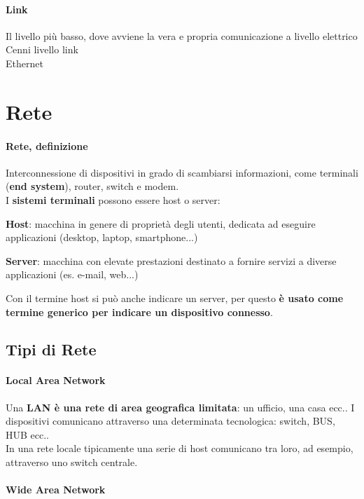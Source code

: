 \documentclass[10pt]{article}
\begin{document}
\paragraph{Link} Il livello più basso, dove avviene la vera e propria comunicazione a livello elettrico\\
Cenni livello link\\
Ethernet\\

\section{Rete}
\paragraph{Rete, definizione} Interconnessione di dispositivi in grado di scambiarsi informazioni, come terminali (\textbf{end system}), router, switch e modem.\\
I \textbf{sistemi terminali} possono essere host o server:
\begin{list}{-}{}
\item \textbf{Host}: macchina in genere di proprietà degli utenti, dedicata ad eseguire applicazioni (desktop, laptop, smartphone...)
\item \textbf{Server}: macchina con elevate prestazioni destinato a fornire servizi a diverse applicazioni (es. e-mail, web...)
\end{list}
Con il termine host si può anche indicare un server, per questo \textbf{è usato come termine generico per indicare un dispositivo connesso}.

\subsection{Tipi di Rete}
\paragraph{Local Area Network} Una \textbf{LAN è una rete di area geografica limitata}: un ufficio, una casa ecc.. I dispositivi comunicano attraverso una determinata tecnologica: switch, BUS, HUB ecc..\\
In una rete locale tipicamente una serie di host comunicano tra loro, ad esempio, attraverso uno switch centrale.
\paragraph{Wide Area Network}
\end{document}
